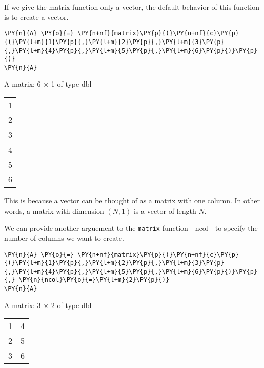 If we give the matrix function only a vector, the default behavior of
this function is to create a vector.

    \begin{tcolorbox}[breakable, size=fbox, boxrule=1pt, pad at break*=1mm,colback=cellbackground, colframe=cellborder]
\begin{Verbatim}[commandchars=\\\{\}]
\PY{n}{A} \PY{o}{=} \PY{n+nf}{matrix}\PY{p}{(}\PY{n+nf}{c}\PY{p}{(}\PY{l+m}{1}\PY{p}{,}\PY{l+m}{2}\PY{p}{,}\PY{l+m}{3}\PY{p}{,}\PY{l+m}{4}\PY{p}{,}\PY{l+m}{5}\PY{p}{,}\PY{l+m}{6}\PY{p}{)}\PY{p}{)}
\PY{n}{A}
\end{Verbatim}
\end{tcolorbox}

    A matrix: 6 × 1 of type dbl
\begin{tabular}{l}
	 1\\
	 2\\
	 3\\
	 4\\
	 5\\
	 6\\
\end{tabular}


    
    This is because a vector can be thought of as a matrix with one column.
In other words, a matrix with dimension \((N,1)\) is a vector of length
\(N\).

We can provide another arguement to the \texttt{matrix}
function---ncol---to specify the number of columns we want to create.

    \begin{tcolorbox}[breakable, size=fbox, boxrule=1pt, pad at break*=1mm,colback=cellbackground, colframe=cellborder]
\begin{Verbatim}[commandchars=\\\{\}]
\PY{n}{A} \PY{o}{=} \PY{n+nf}{matrix}\PY{p}{(}\PY{n+nf}{c}\PY{p}{(}\PY{l+m}{1}\PY{p}{,}\PY{l+m}{2}\PY{p}{,}\PY{l+m}{3}\PY{p}{,}\PY{l+m}{4}\PY{p}{,}\PY{l+m}{5}\PY{p}{,}\PY{l+m}{6}\PY{p}{)}\PY{p}{,} \PY{n}{ncol}\PY{o}{=}\PY{l+m}{2}\PY{p}{)}
\PY{n}{A}
\end{Verbatim}
\end{tcolorbox}

    A matrix: 3 × 2 of type dbl
\begin{tabular}{ll}
	 1 & 4\\
	 2 & 5\\
	 3 & 6\\
\end{tabular}


